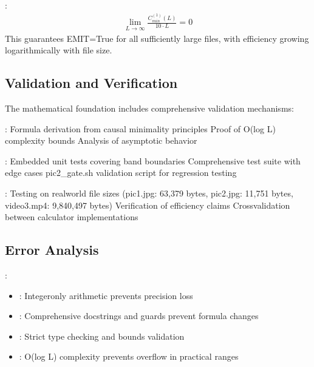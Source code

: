 \documentclass[letterpaper,10pt,english]{sphinxmanual}
\begin{document}
\sphinxAtStartPar
{}:
\begin{equation*}
\begin{split}\lim_{L \to \infty} \frac{C_{min}^{(1)}(L)}{10 \cdot L} = 0\end{split}
\end{equation*}
\sphinxAtStartPar
This guarantees EMIT=True for all sufficiently large files, with efficiency growing logarithmically with file size.


\subsection{Validation and Verification}
\label{\detokenize{mathematical_foundation:validation-and-verification}}
\sphinxAtStartPar
The mathematical foundation includes comprehensive validation mechanisms:

\sphinxAtStartPar
{}:
\sphinxhyphen{} Formula derivation from causal minimality principles
\sphinxhyphen{} Proof of O(log L) complexity bounds
\sphinxhyphen{} Analysis of asymptotic behavior

\sphinxAtStartPar
{}:
\sphinxhyphen{} Embedded unit tests covering band boundaries
\sphinxhyphen{} Comprehensive test suite with edge cases
\sphinxhyphen{} pic2\_gate.sh validation script for regression testing

\sphinxAtStartPar
{}:
\sphinxhyphen{} Testing on real\sphinxhyphen{}world file sizes (pic1.jpg: 63,379 bytes, pic2.jpg: 11,751 bytes, video3.mp4: 9,840,497 bytes)
\sphinxhyphen{} Verification of efficiency claims
\sphinxhyphen{} Cross\sphinxhyphen{}validation between calculator implementations


\subsection{Error Analysis}
\label{\detokenize{mathematical_foundation:error-analysis}}
\sphinxAtStartPar
{}:
\begin{itemize}
\item {} 
\sphinxAtStartPar
{}: Integer\sphinxhyphen{}only arithmetic prevents precision loss

\item {} 
\sphinxAtStartPar
{}: Comprehensive docstrings and guards prevent formula changes

\item {} 
\sphinxAtStartPar
{}: Strict type checking and bounds validation

\item {} 
\sphinxAtStartPar
{}: O(log L) complexity prevents overflow in practical ranges

\end{itemize}
\end{document}
